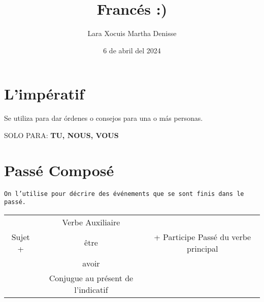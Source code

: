 \documentclass[letterpaper,12pt]{article}
\title {\textbf{Francés :)}}
\author{Lara Xocuis Martha Denisse}
\date{6 de abril del 2024}
\begin{document}
\maketitle
\thispagestyle{empty}
\newpage
\setcounter{page}{1}
\pagestyle{headings}

\begin{sloppypar} 
\section{L'impératif}
Se utiliza para dar órdenes o consejos para una o más personas.

SOLO PARA: \textbf{TU, NOUS, VOUS} 


\section{Passé Composé}
\texttt{On l'utilise pour décrire des événements que se sont finis dans le passé.}
\begin{center}
    \begin{tabular}{|c|c|c|}\hline
        & Verbe Auxiliaire & \\
        Sujet + & être & + Participe Passé du verbe principal\\
        & avoir & \\
        & Conjugue au présent de l'indicatif & \\
        \hline
    \end{tabular}
\end{center}


\end{sloppypar}
\end{document}
